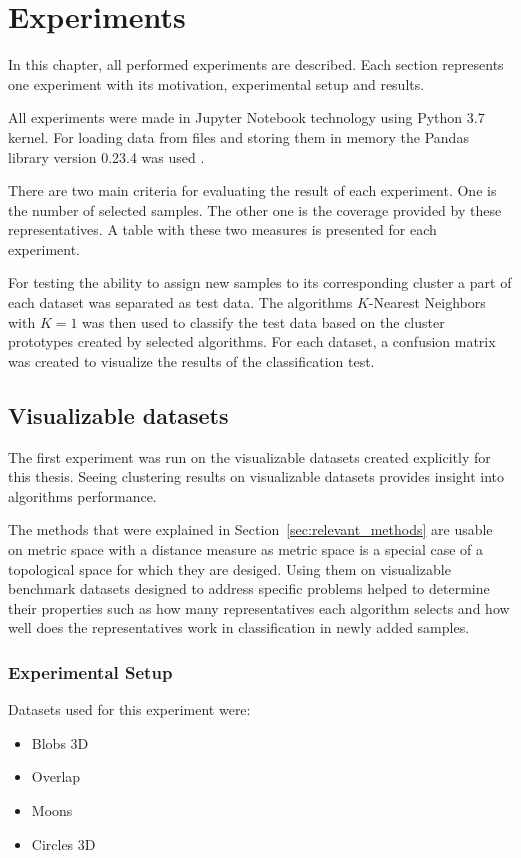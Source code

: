 \documentclass[thesis=B,english]{FITthesis}[2012/10/20]
\begin{document}

\chapter{Experiments}\label{ch:experiments}

In this chapter, all performed experiments are described.
Each section represents one experiment with its motivation, experimental setup and results.

All experiments were made in Jupyter Notebook technology using Python 3.7 kernel.
For loading data from files and storing them in memory the Pandas library version 0.23.4 was used \cite{mckinney2010data}.

There are two main criteria for evaluating the result of each experiment.
One is the number of selected samples.
The other one is the coverage provided by these representatives.
A table with these two measures is presented for each experiment.

For testing the ability to assign new samples to its corresponding cluster a part of each dataset was separated as test data.
The algorithms $K$-Nearest Neighbors with $K=1$ was then used to classify the test data based on the cluster prototypes created by selected algorithms.
For each dataset, a confusion matrix was created to visualize the results of the classification test.

\section{Visualizable datasets}\label{sec:exp1}

The first experiment was run on the visualizable datasets created explicitly for this thesis.
Seeing clustering results on visualizable datasets provides insight into algorithms performance.

The methods that were explained in Section~\ref{sec:relevant_methods} are usable on metric space with a distance measure as metric space is a special case of a topological space for which they are desiged.
Using them on visualizable benchmark datasets designed to address specific problems helped to determine their properties such as how many representatives each algorithm selects and how well does the representatives work in classification in newly added samples.

\subsection{Experimental Setup}
Datasets used for this experiment were:
\begin{itemize}
    \item Blobs 3D
    \item Overlap
    \item Moons
    \item Circles 3D
\end{itemize}
\end{document}
